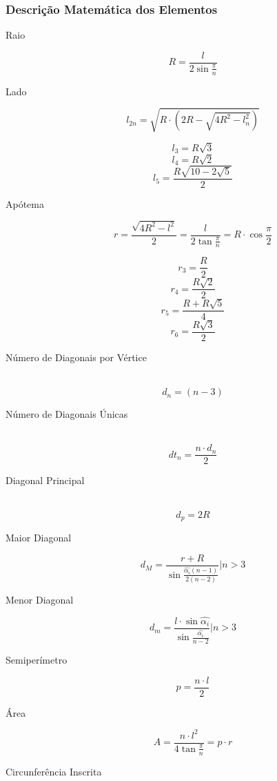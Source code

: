     \subsubsection{Descrição Matemática dos Elementos}
        \begin{description}
            \item[Raio]
                \[ R = \frac{l}{2\sin{\frac{\pi}{n}}} \]
            \item[Lado]
                \[ l_{2n} = \sqrt{R \cdot (2R-\sqrt{4R^2 - l^2_n})} \]
                \begin{multicols}{3}
                    \noindent\[ l_3 = R\sqrt{3} \]
                    \[ l_4 = R\sqrt{2} \]
                    \[ l_5 = \frac{R\sqrt{10 - 2\sqrt{5}}}{2} \]
                \end{multicols}
            \item[Apótema]
                \[ r = \frac{\sqrt{4R^2 - l^2}}{2} = \frac{l}{2\tan{\frac{\pi}{n}}} = R \cdot \cos{\frac{\pi}{2}} \]
                \begin{multicols}{2}
                    \noindent\[ r_3 = \frac{R}{2} \]
                    \[ r_4 = \frac{R\sqrt{2}}{2} \]
                    \[ r_5 = \frac{R + R\sqrt{5}}{4} \]
                    \[ r_6 = \frac{R\sqrt{3}}{2} \]
                \end{multicols}
            \item[Número de Diagonais por Vértice] \hfill \\
                \[ d_n = (n-3) \]
            \item[Número de Diagonais Únicas] \hfill \\
                \[ dt_n = \frac{n \cdot d_n}{2} \]
            \item[Diagonal Principal] \hfill \\
                \[ d_p = 2R \]
            \item[Maior Diagonal]
                \[ d_M = \frac{r + R}{\sin{\frac{\hat{\alpha_i}(n-1)}{2(n-2)}}} | n > 3 \]
            \item[Menor Diagonal]
                \[ d_m = \frac{l \cdot \sin{\hat{\alpha_i}}}{\sin{\frac{\hat{\alpha_i}}{n-2}}} | n > 3 \]
            \item[Semiperímetro]
                \[ p = \frac{ n \cdot l}{2} \]
            \item[Área]
                \[ A = \frac{n \cdot l^2}{4\tan{\frac{\pi}{n}}} = p \cdot r \]
            \item[Circunferência Inscrita] \hfill \\

\end{description}

